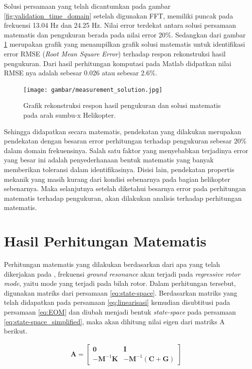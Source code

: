 Solusi persamaan yang telah dicantumkan pada gambar \ref{fig:validation_time_domain} setelah digunakan FFT, memiliki puncak pada frekuensi 13.04 Hz dan 24.25 Hz. Nilai error terdekat antara solusi persamaan matematis dan pengukuran berada pada nilai error 20$\%$. Sedangkan dari gambar \ref{fig:measur_solution} merupakan grafik yang menampilkan grafik solusi matematis untuk identifikasi error RMSE (\textit{Root Mean Square Error}) terhadap respon rekonstruksi hasil pengukuran. Dari hasil perhitungan komputasi pada Matlab didpatkan nilai RMSE nya adalah sebesar 0.026 atau sebesar 2.6$\%$.

\begin{figure}[H]
	\centering
	\texttt{[image: gambar/measurement\_solution.jpg]}
	\caption{Grafik rekonstruksi respon hasil pengukuran dan solusi matematis pada arah sumbu-x Helikopter.}
	\label{fig:measur_solution}
\end{figure}

Sehingga didapatkan secara matematis, pendekatan yang dilakukan merupakan pendekatan dengan besaran error perhitungan terhadap pengukuran sebesar 20$\%$ dalam domain frekuensinya. Salah satu faktor yang menyebabkan terjadinya error yang besar ini adalah penyederhanaan bentuk matematis yang banyak memberikan toleransi dalam identifikasinya. Disisi lain, pendekatan propertis mekanik yang masih kurang dari kondisi sebenarnya pada bagian helikopter sebenarnya. Maka selanjutnya setelah diketahui besarnya error pada perhitungan matematis terhadap pengukuran, akan dilakukan analisis terhadap perhitungan matematis.

\section{Hasil Perhitungan Matematis}

Perhitungan matematis yang dilakukan berdasarkan dari apa yang telah dikerjakan pada \cite{BERGEOT201672}, frekuensi \textit{ground resonance} akan terjadi pada \textit{regressive rotor mode}, yaitu mode yang terjadi pada bilah rotor. Dalam perhitungan tersebut, digunakan matriks dari persamaan \ref{eq:state-space}. Berdasarkan matriks yang telah didapatkan pada persamaan \ref{eq:linearisasi} kemudian disubtitusi pada persamaan \ref{eq:EOM} dan diubah menjadi bentuk \textit{state-space} pada persamaan \ref{eq:state-space_simplified}, maka akan dihitung nilai eigen dari matriks A berikut.

\begin{align*}
	\mathbf{A}=\begin{bmatrix}
	\mathbf{0}& \mathbf{I}\\
	\mathbf{-M}^{-1}\mathbf{K}& \mathbf{-M}^{-1}(\mathbf{C}+\mathbf{G})
	\end{bmatrix}
\end{align*}

